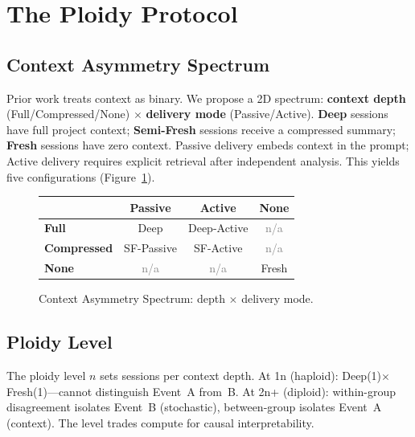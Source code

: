 \documentclass{article}
\begin{document}
\section{The Ploidy Protocol}
\label{sec:protocol}

\subsection{Context Asymmetry Spectrum}

Prior work treats context as binary. We propose a 2D spectrum: \textbf{context depth} (Full/Compressed/None) $\times$ \textbf{delivery mode} (Passive/Active). \textbf{Deep} sessions have full project context; \textbf{Semi-Fresh} sessions receive a compressed summary; \textbf{Fresh} sessions have zero context. Passive delivery embeds context in the prompt; Active delivery requires explicit retrieval after independent analysis. This yields five configurations (Figure~\ref{fig:2d-matrix}).

\begin{figure}[t]
\centering
\caption{Context Asymmetry Spectrum: depth $\times$ delivery mode.}
\label{fig:2d-matrix}
\vspace{0.3em}
\footnotesize
\begin{tabular}{@{} >{\bfseries}l c c c @{}}
\toprule
& \textbf{Passive} & \textbf{Active} & \textbf{None} \\
\midrule
Full & Deep & Deep-Active & \textcolor{gray}{n/a} \\
Compressed & SF-Passive & SF-Active & \textcolor{gray}{n/a} \\
None & \textcolor{gray}{n/a} & \textcolor{gray}{n/a} & Fresh \\
\bottomrule
\end{tabular}
\end{figure}

\subsection{Ploidy Level}

The ploidy level $n$ sets sessions per context depth. At 1n (haploid): Deep(1)$\times$Fresh(1)---cannot distinguish Event~A from~B. At 2n+ (diploid): within-group disagreement isolates Event~B (stochastic), between-group isolates Event~A (context). The level trades compute for causal interpretability.
\end{document}
